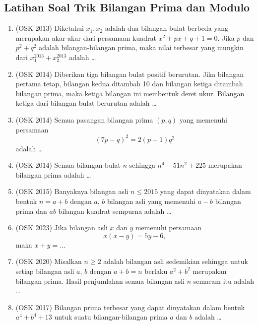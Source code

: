 \subsection{Latihan Soal Trik Bilangan Prima dan Modulo}
\begin{enumerate}
        \item (OSK 2013) Diketahui $x_1,x_2$ adalah dua bilangan bulat berbeda yang merupakan akar-akar dari persamaan kuadrat $x^2+px+q+1=0$. Jika $p$ dan $p^2+q^2$ adalah bilangan-bilangan prima, maka nilai terbesar yang mungkin dari $x_1^{2013}+x_2^{2013}$ adalah \dots
        
        \item (OSK 2014) Diberikan tiga bilangan bulat positif berurutan. Jika bilangan pertama tetap, bilangan kedua ditambah 10 dan bilangan ketiga ditambah bilangan prima, maka ketiga bilangan ini membentuk deret ukur. Bilangan ketiga dari bilangan bulat berurutan adalah \dots
        
        \item (OSK 2014) Semua pasangan bilangan prima $(p,q)$ yang memenuhi persamaan
        $$(7p-q)^2=2(p-1)q^2$$
        adalah \dots
        
        \item (OSK 2014) Semua bilangan bulat $n$ sehingga $n^4-51n^2+225$ merupakan bilangan prima adalah \dots

        \item (OSK 2015) Banyaknya bilangan asli $n \leq 2015$ yang dapat dinyatakan dalam bentuk $n = a + b$ dengan $a$, $b$ bilangan asli yang memenuhi $a - b$ bilangan prima dan $ab$ bilangan kuadrat sempurna adalah \ldots

        
        \item (OSK 2023) Jika bilangan asli $x$ dan $y$ memenuhi persamaan
        $$x(x-y)=5y-6,$$
        maka $x+y=\ldots$

        \item (OSK 2020) Misalkan $n \geq 2$ adalah bilangan asli sedemikian sehingga untuk setiap bilangan asli $a$, $b$ dengan $a + b = n$ berlaku $a^2 + b^2$ merupakan bilangan prima. Hasil penjumlahan semua bilangan asli $n$ semacam itu adalah \ldots

        \item (OSK 2017) Bilangan prima terbesar yang dapat dinyatakan dalam bentuk $a^4+b^4+13$ untuk suatu bilangan-bilangan prima $a$ dan $b$ adalah \ldots
\end{enumerate}